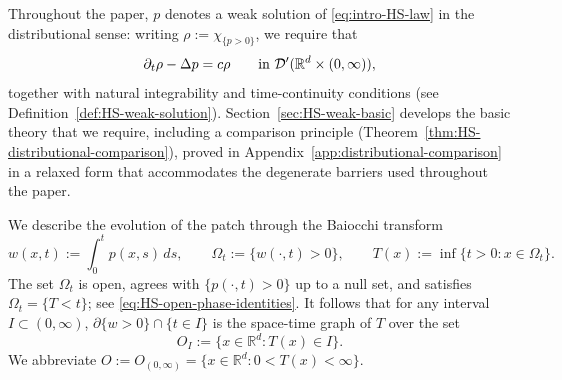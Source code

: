 \documentclass[11pt]{amsart}
\numberwithin{equation}{section}
\numberwithin{figure}{section}
\theoremstyle{plain}
\theoremstyle{definition}
\theoremstyle{remark}
\theoremstyle{plain}
\def\R{\mathbb{R}}
\begin{document}
Throughout the paper, $p$ denotes a weak solution of \eqref{eq:intro-HS-law} in the
distributional sense: writing
$\rho:=\chi_{\{p>0\}}$, we require that
\[
    \partial_t\rho-\Delta p=c\rho \qquad\hbox{in }\mathcal D'(\R^d\times(0,\infty)),
\]
together with natural integrability and time-continuity conditions (see Definition~\ref{def:HS-weak-solution}). Section~\ref{sec:HS-weak-basic} develops the
basic theory that we require, including a comparison principle
(Theorem~\ref{thm:HS-distributional-comparison}), proved in
Appendix~\ref{app:distributional-comparison} in a relaxed form that accommodates the
degenerate barriers used throughout the paper.


 We describe the evolution of the patch through the Baiocchi
transform \cite{BCMP73}
\begin{equation}\label{eq:intro-baiocchi}
    w(x,t):=\int_0^tp(x,s)\,ds,
    \qquad
    \Omega_t:=\{w(\cdot,t)>0\},
    \qquad
    T(x):=\inf\{t>0:x\in\Omega_t\}.
\end{equation}
The set $\Omega_t$ is open, agrees with $\{p(\cdot,t)>0\}$ up to a null set, and satisfies
$\Omega_t=\{T<t\}$; see \eqref{eq:HS-open-phase-identities}. It follows that for any interval $I\subset (0, \infty)$, $\partial\{w>0\}\cap\{t\in I\}$ is the space-time graph of $T$ over the set
\begin{equation}\label{eq:O}
    O_I:=\{x\in\R^d:T(x)\in I\}.
\end{equation}
We abbreviate $O := O_{(0,\infty)} = \{ x\in \R^d : 0 < T(x) < \infty\}$.
\end{document}
